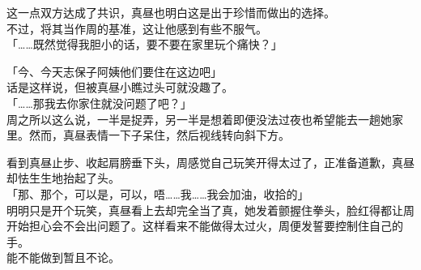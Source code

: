 这一点双方达成了共识，真昼也明白这是出于珍惜而做出的选择。\\

不过，将其当作周的基准，这让他感到有些不服气。\\

「……既然觉得我胆小的话，要不要在家里玩个痛快？」

「今、今天志保子阿姨他们要住在这边吧」\\

话是这样说，但被真昼小瞧过头可就没趣了。\\

「……那我去你家住就没问题了吧？」\\

周之所以这么说，一半是捉弄，另一半是想着即便没法过夜也希望能去一趟她家里。然而，真昼表情一下子呆住，然后视线转向斜下方。

看到真昼止步、收起肩膀垂下头，周感觉自己玩笑开得太过了，正准备道歉，真昼却怯生生地抬起了头。\\

「那、那个，可以是，可以，唔……我……我会加油，收拾的」\\

明明只是开个玩笑，真昼看上去却完全当了真，她发着颤握住拳头，脸红得都让周开始担心会不会出问题了。这样看来不能做得太过火，周便发誓要控制住自己的手。\\

能不能做到暂且不论。

